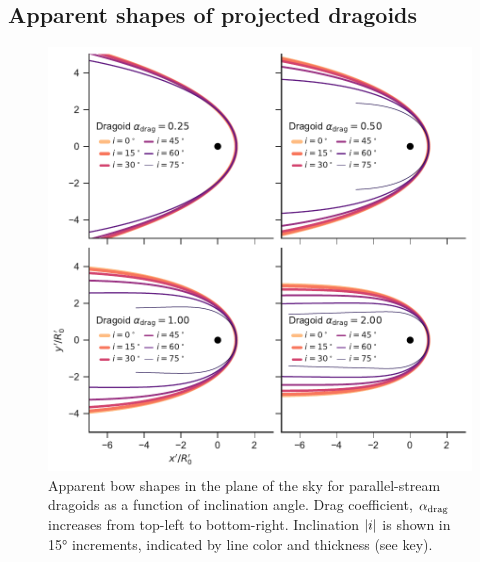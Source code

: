 \subsection{Apparent shapes of projected dragoids}
\label{sec:dust-wave-apparent}

\begin{figure}
  \centering
  \includegraphics[width=\linewidth]{figs/test_xyprime_dragoid}
  \caption{Apparent bow shapes in the plane of the sky for
    parallel-stream dragoids as a function of inclination angle.  Drag
    coefficient, \(\alpha_{\text{drag}}\) increases from top-left to bottom-right.
    Inclination \(\lvert i\rvert\) is shown in \ang{15} increments, indicated
    by line color and thickness (see key).}
  \label{fig:dragoid-xy-prime}
\end{figure}
